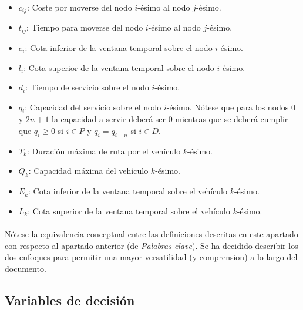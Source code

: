 \documentclass{subfiles}
\begin{document}
\begin{itemize}
          \item $c_{ij}$: Coste por moverse del nodo $i$-ésimo al nodo $j$-ésimo.

          \item $t_{ij}$: Tiempo para moverse del nodo $i$-ésimo al nodo $j$-ésimo.

          \item $e_{i}$: Cota inferior de la ventana temporal sobre el nodo $i$-ésimo.

          \item $l_{i}$: Cota superior de la ventana temporal sobre el nodo $i$-ésimo.

          \item $d_{i}$: Tiempo de servicio sobre el nodo $i$-ésimo.

          \item $q_{i}$: Capacidad del servicio sobre el nodo $i$-ésimo. Nótese que para los nodos $0$ y $2n + 1$ la capacidad a servir deberá ser $0$ mientras que se deberá cumplir que $q_{i} \geq 0$ si $i \in P$ y $q_{i} = q_{i - n}$ si $i \in D$.

          \item $T_{k}$: Duración máxima de ruta por el vehículo $k$-ésimo.

          \item $Q_{k}$: Capacidad máxima del vehículo $k$-ésimo.

          \item $E_{k}$: Cota inferior de la ventana temporal sobre el vehículo $k$-ésimo.

          \item $L_{k}$: Cota superior de la ventana temporal sobre el vehículo $k$-ésimo.

        \end{itemize}

        \paragraph{}
        Nótese la equivalencia conceptual entre las definiciones descritas en este apartado con respecto al apartado anterior (de \emph{Palabras clave}). Se ha decidido describir los dos enfoques para permitir una mayor versatilidad (y comprension) a lo largo del documento.

      \subsection{Variables de decisión}
      \label{sec:formulation_variables}
\end{document}
